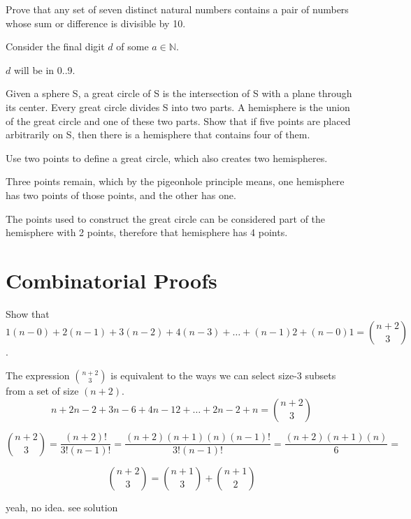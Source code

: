 \documentclass[openany, 11pt]{book}
\begin{document}
\begin{exercise}{}{}
	Prove that any set of seven distinct natural numbers
	contains a pair of numbers whose sum or difference is divisible by 10.

	\begin{alist}
		\item Consider the final digit $d$ of some $a \in \mathbb{N}$.
		\item $d$ will be in 0..9.
	\end{alist}
\end{exercise}

\begin{exercise}{}{}
	Given a sphere S, a great circle of S is the intersection
	of S with a plane through its center. Every great circle divides S into two
	parts. A hemisphere is the union of the great circle and one of these two parts.
	Show that if five points are placed arbitrarily on S, then there is a hemisphere
	that contains four of them.
	\begin{alist}
		\item Use two points to define a great circle, which also creates two
		hemispheres.
		\item Three points remain, which by the pigeonhole principle means, one
		hemisphere has two points of those points, and the other has one.
		\item The points used to construct the great circle can be considered part of
		the hemisphere with 2 points, therefore that hemisphere has 4 points.
	\end{alist}
\end{exercise}

\section{Combinatorial Proofs}
\begin{exercise}{}{}
	Show that
	$$1(n-0)+2(n-1)+3(n-2)+4(n-3)+\dots+(n-1)2+(n-0)1 = \binom{n+2}{3}$$ .
	\begin{alist}
		\item The expression $\binom{n+2}{3}$ is equivalent to the ways we can select
		size-3 subsets from a set of size $(n+2)$.
		$$
			n+2n-2+3n-6+4n-12+\dots+2n-2+n = \binom{n+2}{3}
		$$

		$$
			\binom{n+2}{3}=
			\dfrac{(n+2)!}{3!(n-1)!}=
			\dfrac{(n+2)(n+1)(n)(n-1)!}{3!(n-1)!}=
			\dfrac{(n+2)(n+1)(n)}{6}=
		$$

		$$
			\binom{n+2}{3} = \binom{n+1}{3} + \binom{n+1}{2}
		$$
	\end{alist}
	yeah, no idea. see solution
\end{exercise}
\end{document}

